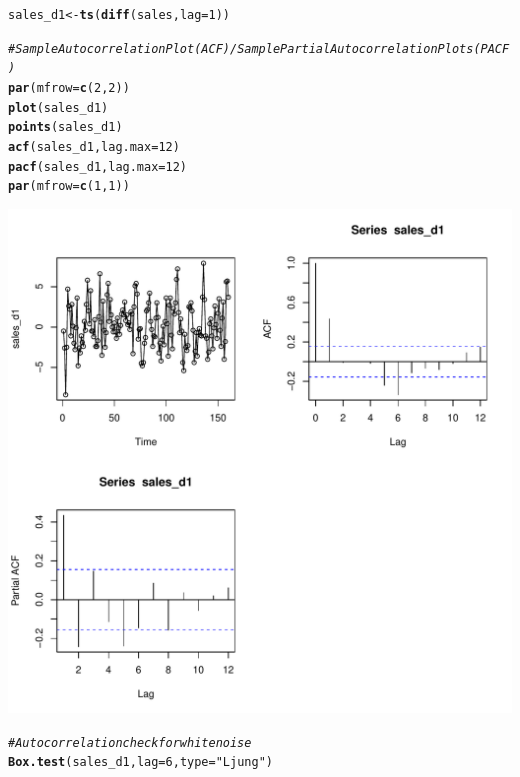 \documentclass{article}\usepackage[]{graphicx}\usepackage[]{color}
\makeatletter
\def\maxwidth{ %
  \ifdim\Gin@nat@width>\linewidth
    \linewidth
  \else
    \Gin@nat@width
  \fi
}
\newcommand{\hlnum}[1]{\textcolor[rgb]{0.686,0.059,0.569}{#1}}%
\newcommand{\hlstr}[1]{\textcolor[rgb]{0.192,0.494,0.8}{#1}}%
\newcommand{\hlcom}[1]{\textcolor[rgb]{0.678,0.584,0.686}{\textit{#1}}}%
\newcommand{\hlstd}[1]{\textcolor[rgb]{0.345,0.345,0.345}{#1}}%
\newcommand{\hlkwb}[1]{\textcolor[rgb]{0.69,0.353,0.396}{#1}}%
\newcommand{\hlkwc}[1]{\textcolor[rgb]{0.333,0.667,0.333}{#1}}%
\newcommand{\hlkwd}[1]{\textcolor[rgb]{0.737,0.353,0.396}{\textbf{#1}}}%
\newenvironment{kframe}{%
 \def\at@end@of@kframe{}%
 \ifinner\ifhmode%
  \def\at@end@of@kframe{\end{minipage}}%
  \begin{minipage}{\columnwidth}%
 \fi\fi%
 \def\FrameCommand##1{\hskip\@totalleftmargin \hskip-\fboxsep
 \colorbox{shadecolor}{##1}\hskip-\fboxsep
     \hskip-\linewidth \hskip-\@totalleftmargin \hskip\columnwidth}%
 \MakeFramed {\advance\hsize-\width
   \@totalleftmargin\z@ \linewidth\hsize
   \@setminipage}}%
 {\par\unskip\endMakeFramed%
 \at@end@of@kframe}
\newenvironment{knitrout}{}{} %
\makeatother
\begin{document}
\begin{knitrout}
\color{fgcolor}\begin{kframe}
\begin{alltt}
\hlstd{sales_d1} \hlkwb{<-} \hlkwd{ts}\hlstd{(}\hlkwd{diff}\hlstd{(sales,} \hlkwc{lag} \hlstd{=} \hlnum{1}\hlstd{))}

\hlcom{# Sample Autocorrelation Plot (ACF) / Sample Partial Autocorrelation Plots (PACF)}
\hlkwd{par}\hlstd{(}\hlkwc{mfrow} \hlstd{=} \hlkwd{c}\hlstd{(}\hlnum{2}\hlstd{,} \hlnum{2}\hlstd{))}
\hlkwd{plot}\hlstd{(sales_d1)}
\hlkwd{points}\hlstd{(sales_d1)}
\hlkwd{acf}\hlstd{(sales_d1,} \hlkwc{lag.max} \hlstd{=} \hlnum{12}\hlstd{)}
\hlkwd{pacf}\hlstd{(sales_d1,} \hlkwc{lag.max} \hlstd{=} \hlnum{12}\hlstd{)}
\hlkwd{par}\hlstd{(}\hlkwc{mfrow} \hlstd{=} \hlkwd{c}\hlstd{(}\hlnum{1}\hlstd{,} \hlnum{1}\hlstd{))}
\end{alltt}
\end{kframe}
\includegraphics[width=\maxwidth]{figure/unnamed-chunk-5-1} 
\begin{kframe}\begin{alltt}
\hlcom{# Autocorrelation check for white noise}
\hlkwd{Box.test}\hlstd{(sales_d1,} \hlkwc{lag} \hlstd{=} \hlnum{6}\hlstd{,} \hlkwc{type} \hlstd{=} \hlstr{"Ljung"}\hlstd{)}
\end{alltt}

\end{kframe}
\end{knitrout}
\end{document}
